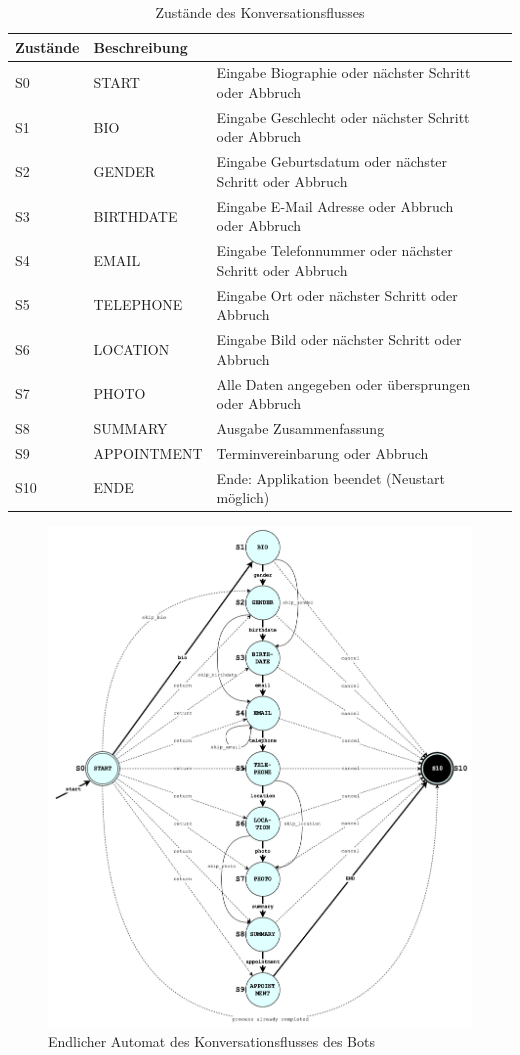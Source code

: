 	\begin{table} %
		\centering
		\begin{tabular}{l | l l l l}
			\textbf{Zustände} 	& \textbf{Beschreibung}\\
			\hline
			S0 					&		 START 			&		 Eingabe Biographie oder nächster Schritt oder Abbruch\\
			S1 					&		 BIO 			&		 Eingabe Geschlecht oder nächster Schritt oder Abbruch\\
			S2 					&		 GENDER 		&		 Eingabe Geburtsdatum oder nächster Schritt oder Abbruch\\
			S3 					&		 BIRTHDATE 		&		 Eingabe E-Mail Adresse oder Abbruch oder Abbruch\\
			S4 					&		 EMAIL 			&		 Eingabe Telefonnummer oder nächster Schritt oder Abbruch\\
			S5 					&		 TELEPHONE 		&		 Eingabe Ort oder nächster Schritt oder Abbruch\\
			S6 					&		 LOCATION 		&		 Eingabe Bild oder nächster Schritt oder Abbruch\\
			S7 					&		 PHOTO 			&		 Alle Daten angegeben oder übersprungen oder Abbruch\\
			S8 					&		 SUMMARY 		&		 Ausgabe Zusammenfassung\\
			S9 					&		 APPOINTMENT	&		 Terminvereinbarung oder Abbruch\\
			S10 				&		 ENDE 			&		 Ende: Applikation beendet (Neustart möglich)\\
			
		\end{tabular}
		\caption{Zustände des Konversationsflusses}
		\label{tab: states}
	\end{table}
	
	\begin{figure} %
		\centering
		\includegraphics[width=1.0\textwidth]{images/220326_PA28464_State-Machine.png}
		\caption{Endlicher Automat des Konversationsflusses des Bots}
		\label{fig: state machine}
	\end{figure}
	